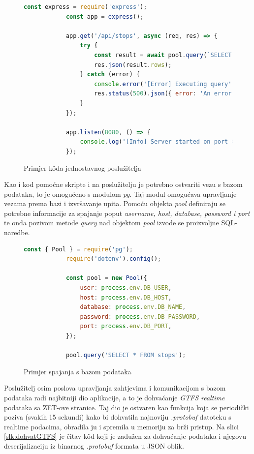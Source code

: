 \documentclass[zavrsnirad]{fer}
\begin{document}
\begin{figure}[H]
	\centering
	\begin{minipage}{0.9\linewidth}
		\begin{lstlisting}[language=JavaScript]
			const express = require('express');
			const app = express();
			
			app.get('/api/stops', async (req, res) => {
				try {
					const result = await pool.query(`SELECT DISTINCT stop_name FROM stops`);
					res.json(result.rows);
				} catch (error) {
					console.error('[Error] Executing query', error);
					res.status(500).json({ error: 'An error occurred' });
				}
			});
			
			app.listen(8080, () => {
				console.log('[Info] Server started on port 8080');
			});
		\end{lstlisting}
	\end{minipage}
	\caption{Primjer k\^oda jednostavnog poslužitelja}
	\label{slk:express}
\end{figure}
\newpage
Kao i kod pomoćne skripte i na poslužitelju je potrebno ostvariti vezu s bazom podataka, to je omogućeno s modulom \textit{pg}. Taj modul omogućava upravljanje vezama prema bazi i izvršavanje upita.
Pomoću objekta \textit{pool} definiraju se potrebne informacije za spajanje poput \textit{username, host, database, password i port} te onda pozivom metode \textit{query} nad objektom \textit{pool} izvode se proizvoljne SQL-naredbe.

\begin{figure}[H]
	\centering
	\begin{minipage}{0.9\linewidth}
		\begin{lstlisting}[language=JavaScript]
			const { Pool } = require('pg');
			require('dotenv').config();

			const pool = new Pool({
				user: process.env.DB_USER,
				host: process.env.DB_HOST,
				database: process.env.DB_NAME,
				password: process.env.DB_PASSWORD,
				port: process.env.DB_PORT,
			});
			
			pool.query('SELECT * FROM stops');
		\end{lstlisting}
	\end{minipage}
	\caption{Primjer spajanja s bazom podataka}
	\label{slk:baza}
\end{figure}

Poslužitelj osim poslova upravljanja zahtjevima i komunikacijom s bazom podataka radi najbitniji dio aplikacije, a to je dohvaćanje \textit{GTFS realtime} podataka sa ZET-ove stranice. Taj dio je ostvaren kao funkcija koja se periodički poziva (svakih 15 sekundi) kako bi dohvatila najnoviju \textit{.protobuf} datoteku s realtime podacima, obradila ju i spremila u memoriju za brži pristup. Na slici \ref{slk:dohvatGTFS} je čitav k\^od koji je zadužen za dohvaćanje podataka i njegovu deserijalizaciju iz binarnog \textit{.protobuf} formata u JSON oblik.\\
\end{document}
